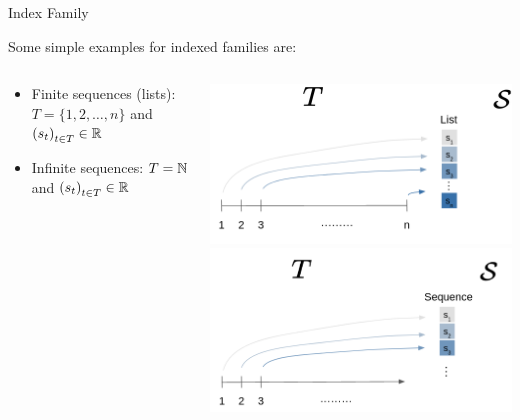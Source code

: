 \begin{frame}[c,allowframebreaks]{Index Family}

Some simple examples for indexed families are:
\begin{columns}[T]
\begin{column}{.5\textwidth}
\vspace*{1cm}
  \begin{itemize}
  \item Finite sequences (lists): $T = \{1, 2,\dots, n\}$ and $\left(s_t\right)_{t \in T}\in\mathbb{R} $
  \vspace{2.5cm}
  \item Infinite sequences: $T = \mathbb{N}$ and $\left(s_t\right)_{t \in T} \in \mathbb{R}$
  \end{itemize}
  
\end{column}
\begin{column}{.35\textwidth}
\includegraphics[width=\textwidth]{figure_man/indexed_family/indexed_family_1.png}\\
\includegraphics[width=\textwidth]{figure_man/indexed_family/indexed_family_2.png}
\end{column}
\end{columns}


\end{frame}
